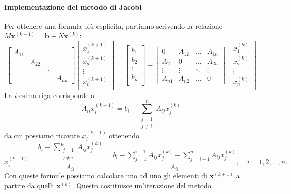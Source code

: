 \documentclass[a4paper]{report}
\theoremstyle{definition}
\theoremstyle{remark}
\newcommand{\x}{\mathbf{x}}
\renewcommand{\b}{\mathbf{b}}
\begin{document}
\paragraph{Implementazione del metodo di Jacobi}
Per ottenere una formula più esplicita, partiamo scrivendo la relazione $M\x^{(k+1)} = \b + N\x^{(k)}$:
\[
\begin{bmatrix}
    A_{11}\\
    & A_{22}\\
    & & \ddots \\
    & & & A_{nn}
\end{bmatrix}
\begin{bmatrix}
    x_1^{(k+1)}\\
    x_2^{(k+1)}\\
    \vdots\\
    x_n^{(k+1)}\\
\end{bmatrix}
=
\begin{bmatrix}
    b_1\\
    b_2\\
    \vdots\\
    b_n\\
\end{bmatrix}
-
\begin{bmatrix}
    0 & A_{12} & \dots & A_{1n}\\
    A_{21} & 0 & \dots & A_{2n}\\
    \vdots & \vdots & \ddots & \vdots\\
    A_{n1} & A_{n2} & \dots & 0
\end{bmatrix}
\begin{bmatrix}
    x_1^{(k)}\\
    x_2^{(k)}\\
    \vdots \\
    x_n^{(k)}\\
\end{bmatrix}
\]
La $i$-esima riga corrisponde a
\[
A_{ii}x_i^{(k+1)} = b_i - \sum_{\substack{j=1\\ j \neq i}}^n A_{ij}x_j^{(k)}
\]
da cui possiamo ricavare $x_i^{(k+1)}$ ottenendo
\[
x_i^{(k+1)} = \frac{b_i - \sum_{\substack{j=1\\ j \neq i}}^n A_{ij}x_j^{(k)}}{A_{ii}} = \frac{b_i - \sum_{j=1}^{i-1} A_{ij}x_j^{(k)} - \sum_{j=i+1}^n A_{ij}x_j^{(k)} }{A_{ii}}, \quad i=1,2,\dots,n.
\]
Con queste formule possiamo calcolare uno ad uno gli elementi di $\x^{(k+1)}$ a partire da quelli $\x^{(k)}$. Questo costituisce un'iterazione del metodo.
\end{document}
